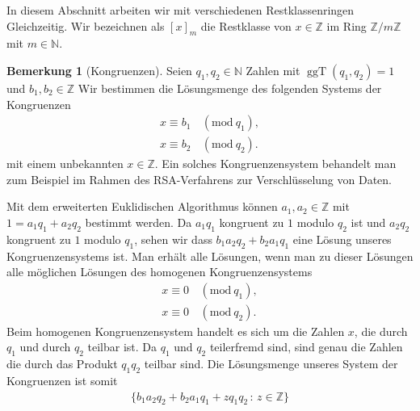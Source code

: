 \documentclass[
a4paper,12pt,
bibliography=totocnumbered,
numbers=noenddot,
]{scrartcl}
\numberwithin{equation}{subsection}
\newcommand{\N}{\mathbb N}
\newcommand{\Z}{\mathbb Z}
\newcommand{\ggT}{\operatorname{ggT}} %
\theoremstyle{plain}
\theoremstyle{definition}
\newtheorem*{bem}{Bemerkung}
\begin{document}
In diesem Abschnitt arbeiten wir mit verschiedenen Restklassenringen Gleichzeitig. Wir bezeichnen als $[x]_m$ die Restklasse von $x \in \Z$ im Ring $\Z / m \Z$ mit $m \in \N$. 

\newcommand{\mymod}[1]{\,(\mathrm{mod} \ #1)}
\begin{bem}[Kongruenzen]
	Seien $q_1, q_2 \in \N$ Zahlen mit $\ggT(q_1, q_2) = 1$ und $b_1, b_2 \in \Z$ Wir bestimmen die Lösungsmenge des folgenden Systems der Kongruenzen
	\begin{align*}
			x \equiv b_1 & \mymod{q_1},
			\\ x \equiv b_2 & \mymod{q_2}.
	\end{align*}
	mit einem unbekannten $x \in \Z$. Ein solches Kongruenzensystem behandelt man zum Beispiel im Rahmen des RSA-Verfahrens zur Verschlüsselung von Daten.  
	
	Mit dem erweiterten Euklidischen Algorithmus können $a_1, a_2 \in \Z$ mit $1 = a_1 q_1 + a_2 q_2$ bestimmt werden. Da $a_1 q_1$ kongruent zu $1$ modulo $q_2$ ist und $a_2 q_2$ kongruent zu $1$ modulo $q_1$, sehen wir dass $b_1 a_2 q_2 + b_2 a_1 q_1$ eine Lösung unseres Kongruenzensystems ist. Man erhält alle Lösungen, wenn man zu dieser Lösungen alle möglichen Lösungen des homogenen Kongruenzensystems 
	\begin{align*}
	x \equiv 0 & \mymod{q_1},
	\\ x \equiv 0 & \mymod{q_2}.
\end{align*}
	Beim homogenen Kongruenzensystem handelt es sich um die Zahlen $x$, die durch $q_1$ und durch $q_2$ teilbar ist. Da $q_1$ und $q_2$ teilerfremd sind, sind genau die Zahlen die durch das Produkt $q_1 q_2$ teilbar sind. Die Lösungsmenge unseres System der Kongruenzen ist somit 
	\begin{align*}
			\{  b_1 a_2 q_2 + b_2 a_1 q_1 + z q_1 q_2  \,:\, z \in \Z \}
	\end{align*} 
\end{bem} 
\end{document}
